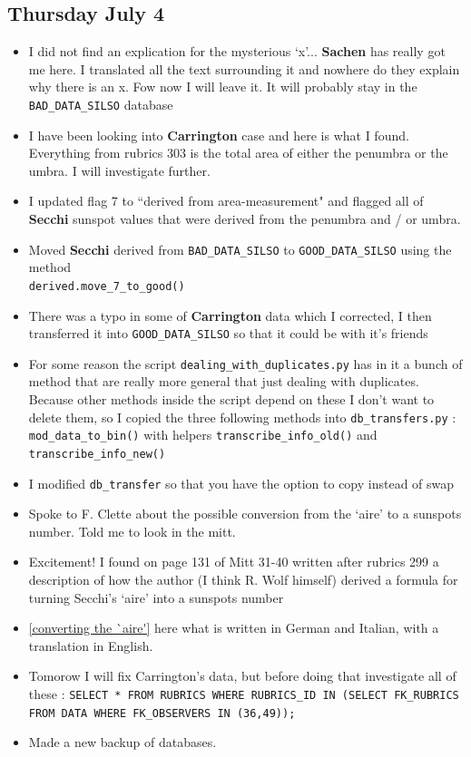 \documentclass[12pt]{article}
\begin{document}
\subsection{Thursday July 4}
\begin{itemize}
    \item I did not find an explication for the mysterious `x'... \textbf{Sachen} has really got me here. I translated all the text surrounding it and nowhere do they explain why there is an x. Fow now I will leave it. It will probably stay in the \texttt{BAD\_DATA\_SILSO} database
    \item I have been looking into \textbf{Carrington} case and here is what I found. Everything from rubrics 303 is the total area of either the penumbra or the umbra. I will investigate further.
    \item I updated flag 7 to ``derived from area-measurement" and flagged all of \textbf{Secchi} sunspot values that were derived from the penumbra and / or umbra.
    \item Moved \textbf{Secchi} derived from \texttt{BAD\_DATA\_SILSO} to \texttt{GOOD\_DATA\_SILSO} using the method \\\texttt{derived.move\_7\_to\_good()}
    \item There was a typo in some of \textbf{Carrington} data which I corrected, I then transferred it into \texttt{GOOD\_DATA\_SILSO} so that it could be with it's friends
    \item For some reason the script \texttt{dealing\_with\_duplicates.py} has in it a bunch of method that are really more general that just dealing with duplicates. Because other methods inside the script depend on these I don't want to delete them, so I copied the three following methods into \texttt{db\_transfers.py} : \texttt{mod\_data\_to\_bin()} with helpers \texttt{transcribe\_info\_old()} and \texttt{transcribe\_info\_new()}
    \item I modified \texttt{db\_transfer} so that you have the option to copy instead of swap
    \item Spoke to F. Clette about the possible conversion from the `aire' to a sunspots number. Told me to look in the mitt.
    \item Excitement! I found on page 131 of Mitt 31-40 written after rubrics 299 a description of how the author (I think R. Wolf himself) derived a formula for turning Secchi's `aire' into a sunspots number
    \item \ref{converting the `aire'} here what is written in German and Italian, with a translation in English.
    \item Tomorow I will fix Carrington's data, but before doing that investigate all of these : \texttt{SELECT * FROM RUBRICS WHERE RUBRICS\_ID IN (SELECT FK\_RUBRICS FROM DATA WHERE FK\_OBSERVERS IN (36,49));}
    \item Made a new backup of databases.
\end{itemize}
        
\end{document}
